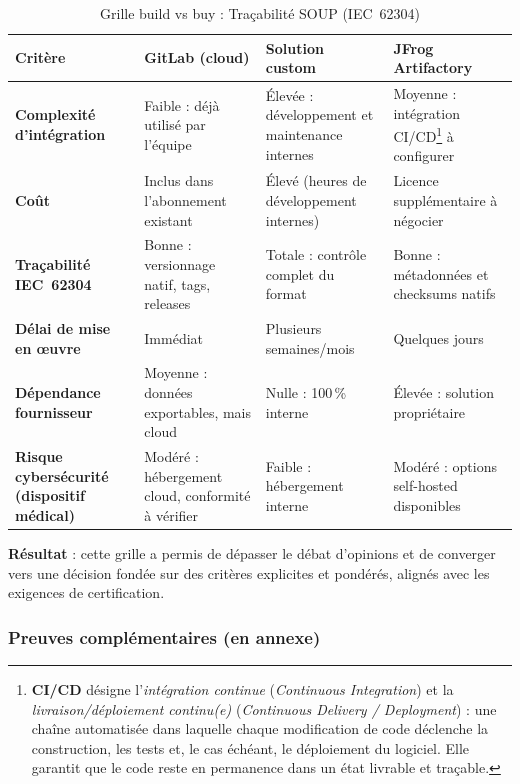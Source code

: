 \begin{table}[h!]
  \centering\small
  \begin{tabularx}{\textwidth}{|p{3.6cm}|X|X|X|}
    \hline
    \textbf{Critère} & \textbf{GitLab (cloud)} & \textbf{Solution custom} & \textbf{JFrog Artifactory} \\
    \hline
    \textbf{Complexité d'intégration}
      & Faible : déjà utilisé par l'équipe
      & Élevée : développement et maintenance internes
      & Moyenne : intégration CI/CD\footnote{\textbf{CI/CD} désigne l'\emph{intégration continue} (\emph{Continuous Integration}) et la \emph{livraison/déploiement continu(e)} (\emph{Continuous Delivery / Deployment}) : une chaîne automatisée dans laquelle chaque modification de code déclenche la construction, les tests et, le cas échéant, le déploiement du logiciel. Elle garantit que le code reste en permanence dans un état livrable et traçable.\label{fn:cicd}} à configurer \\
    \hline
    \textbf{Coût}
      & Inclus dans l'abonnement existant
      & Élevé (heures de développement internes)
      & Licence supplémentaire à négocier \\
    \hline
    \textbf{Traçabilité IEC~62304}
      & Bonne : versionnage natif, tags, releases
      & Totale : contrôle complet du format
      & Bonne : métadonnées et checksums natifs \\
    \hline
    \textbf{Délai de mise en \oe{}uvre}
      & Immédiat
      & Plusieurs semaines/mois
      & Quelques jours \\
    \hline
    \textbf{Dépendance fournisseur}
      & Moyenne : données exportables, mais cloud
      & Nulle : 100\,\% interne
      & Élevée : solution propriétaire \\
    \hline
    \textbf{Risque cybersécurité (dispositif médical)}
      & Modéré : hébergement cloud, conformité à vérifier
      & Faible : hébergement interne
      & Modéré : options self-hosted disponibles \\
    \hline
  \end{tabularx}
  \caption{Grille build vs buy : Traçabilité SOUP (IEC~62304)}
  \label{tab:buildvsbuy}
\end{table}

\textbf{Résultat} : cette grille a permis de dépasser le débat d'opinions et de converger vers une décision fondée sur des critères explicites et pondérés, alignés avec les exigences de certification.

\subsubsection{Preuves complémentaires (en annexe)}

